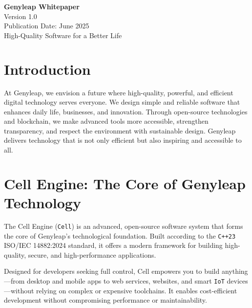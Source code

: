 \documentclass[a4paper,12pt,openany]{book}
\begin{document}
\begin{titlepage}
    \begin{center}
        \vspace*{1.5cm}
        {\Huge \textbf{Genyleap Whitepaper}} \\
        \vspace{0.5cm}
        {\Large Version 1.0} \\
        \vspace{0.5cm}
        {\large Publication Date: June 2025} \\
        \vspace{1.5cm}
        {\large High-Quality Software for a Better Life} \\
    \end{center}
    \vfill
\end{titlepage}

\chapter{Introduction}
At Genyleap, we envision a future where high-quality, powerful, and efficient digital technology serves everyone. We design simple and reliable software that enhances daily life, businesses, and innovation. Through open-source technologies and blockchain, we make advanced tools more accessible, strengthen transparency, and respect the environment with sustainable design. Genyleap delivers technology that is not only efficient but also inspiring and accessible to all.

\chapter{Cell Engine: The Core of Genyleap Technology}

The Cell Engine (\texttt{Cell}) is an advanced, open-source software system that forms the core of Genyleap's technological foundation. Built according to the \texttt{C++23} ISO/IEC 14882:2024 standard, it offers a modern framework for building high-quality, secure, and high-performance applications.

Designed for developers seeking full control, Cell empowers you to build anything—from desktop and mobile apps to web services, websites, and smart \texttt{IoT} devices—without relying on complex or expensive toolchains. It enables cost-efficient development without compromising performance or maintainability.
\end{document}
